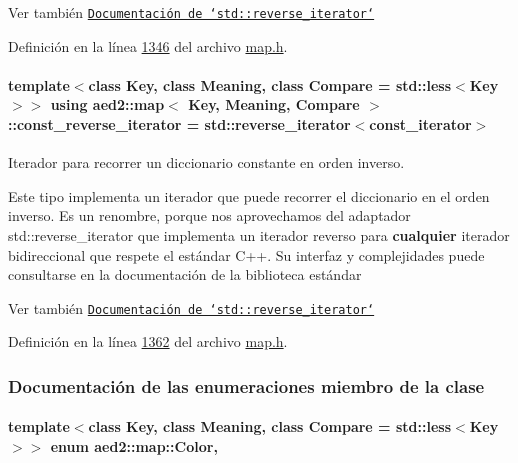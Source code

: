 \begin{DoxySeeAlso}{Ver también}
\href{http://en.cppreference.com/w/cpp/iterator/reverse_iterator}{\tt Documentación de `std\-::reverse\-\_\-iterator`} 
\end{DoxySeeAlso}


Definición en la línea \hyperlink{map_8h_source_l01346}{1346} del archivo \hyperlink{map_8h_source}{map.\-h}.

\hypertarget{classaed2_1_1map_aed66a216549d13078a3ea6978ea0b768_aed66a216549d13078a3ea6978ea0b768}{
\paragraph[{const\-\_\-reverse\-\_\-iterator}]{\setlength{\rightskip}{0pt plus 5cm}template$<$class Key, class Meaning, class Compare = std\-::less$<$\-Key$>$$>$ using {\bf aed2\-::map}$<$ Key, Meaning, Compare $>$\-::{\bf const\-\_\-reverse\-\_\-iterator} =  std\-::reverse\-\_\-iterator$<${\bf const\-\_\-iterator}$>$}}\label{classaed2_1_1map_aed66a216549d13078a3ea6978ea0b768_aed66a216549d13078a3ea6978ea0b768}


Iterador para recorrer un diccionario constante en orden inverso. 

Este tipo implementa un iterador que puede recorrer el diccionario en el orden inverso. Es un renombre, porque nos aprovechamos del adaptador {\ttfamily std\-::reverse\-\_\-iterator} que implementa un iterador reverso para {\bfseries cualquier} iterador bidireccional que respete el estándar C++. Su interfaz y complejidades puede consultarse en la documentación de la biblioteca estándar

\begin{DoxySeeAlso}{Ver también}
\href{http://en.cppreference.com/w/cpp/iterator/reverse_iterator}{\tt Documentación de `std\-::reverse\-\_\-iterator`} 
\end{DoxySeeAlso}


Definición en la línea \hyperlink{map_8h_source_l01362}{1362} del archivo \hyperlink{map_8h_source}{map.\-h}.



\subsubsection{Documentación de las enumeraciones miembro de la clase}
\hypertarget{classaed2_1_1map_a6d62a415a4b9d320b30cada4ebcf9f5b_a6d62a415a4b9d320b30cada4ebcf9f5b}{
\paragraph[{Color}]{\setlength{\rightskip}{0pt plus 5cm}template$<$class Key, class Meaning, class Compare = std\-::less$<$\-Key$>$$>$ enum {\bf aed2\-::map\-::\-Color}\hspace{0.3cm}{\ttfamily [strong]}, {\ttfamily [private]}}}\label{classaed2_1_1map_a6d62a415a4b9d320b30cada4ebcf9f5b_a6d62a415a4b9d320b30cada4ebcf9f5b}


